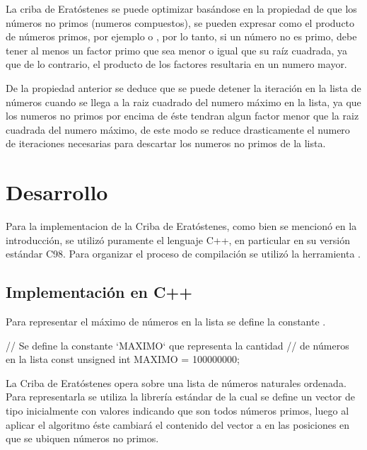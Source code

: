 \documentclass[12pt]{article}
\newenvironment{fullgrayverb}
{\verbbox}
{\endverbbox\par\colorbox{gray!25}{\parbox{\textwidth}{\theverbbox}}\par}
\begin{document}
La criba de Eratóstenes se puede optimizar basándose en la propiedad de que los
números no primos (numeros compuestos), se pueden expresar como el producto de
números primos, por ejemplo  o , por lo tanto, si
un número no es primo, debe tener al menos un factor primo que sea menor o igual
que su raíz cuadrada, ya que de lo contrario, el producto de los factores
resultaria en un numero mayor.

De la propiedad anterior se deduce que se puede detener la iteración en la lista
de números cuando se llega a la raiz cuadrado del numero máximo en la lista, ya
que los numeros no primos por encima de éste tendran algun factor menor que la
raiz cuadrada del numero máximo, de este modo se reduce drasticamente el numero
de iteraciones necesarias para descartar los numeros no primos de la lista.

\section{Desarrollo}

Para la implementacion de la Criba de Eratóstenes, como bien se mencionó en la
introducción, se utilizó puramente el lenguaje C++, en particular en su versión
estándar C98. Para organizar el proceso de compilación se utilizó la herramienta
.


\subsection{Implementación en C++}

Para representar el máximo de números en la lista se define la constante
.

\begin{fullgrayverb}[\mbox{}]
// Se define la constante `MAXIMO` que representa la cantidad
// de números en la lista
const unsigned int MAXIMO = 100000000;
\end{fullgrayverb}

La Criba de Eratóstenes opera sobre una lista de números naturales ordenada.
Para representarla se utiliza la librería estándar  de la cual
se define un vector de tipo  inicialmente con valores 
indicando que son todos números primos, luego al aplicar el algoritmo éste
cambiará el contenido del vector a  en las posiciones en que se
ubiquen números no primos.
\end{document}
